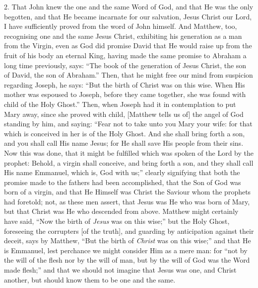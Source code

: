 \documentclass[9pt, twocolumn, oneside, a4paper]{memoir}
\newcommand{\gloss}[1]{%
    \marginpar[\RaggedLeft \footnotesize{#1}]{\RaggedRight \footnotesize{#1}}}
\begin{document}
2. That John knew the one and the same Word of God, and that He was the only begotten, and that He became incarnate for our salvation, Jesus Christ our Lord, I have sufficiently proved from the word of John himself. And Matthew, too, recognising one and the same Jesus Christ, exhibiting his generation as a man from the Virgin,  even as God did promise David that He would raise up from the fruit of his body an eternal King, having made the same promise to Abraham a long time previously, says: ``The book of the generation of Jesus Christ, the son of David, the son of Abraham.'' \gloss{Matthew 1:1} Then, that he might free our mind from suspicion regarding Joseph, he says: ``But the birth of Christ  was on this  wise. When His mother was espoused to Joseph, before they came together, she was found with child of the Holy Ghost.'' Then, when Joseph had it in contemplation to put Mary away, since she proved with child, [Matthew tells us of] the angel of God standing by him, and saying: ``Fear not to take unto you Mary your wife: for that which is conceived in her is of the Holy Ghost. And she shall bring forth a son, and you shall call His name Jesus; for He shall save His people from their sins. Now this was done, that it might be fulfilled which was spoken of the Lord by the prophet: Behold, a virgin shall conceive, and bring forth a son, and they shall call His name Emmanuel, which is, God with us;'' clearly signifying that both the promise made to the fathers had been accomplished, that the Son of God was born of a virgin, and that He Himself was Christ the Saviour whom the prophets had foretold; not, as these men assert, that Jesus was He who was born of Mary, but that Christ was He who descended from above. Matthew might certainly have said, ``Now the birth of \textit{Jesus} was on this wise;'' but the Holy Ghost, foreseeing the corrupters [of the truth], and guarding by anticipation against their deceit, says by Matthew, ``But the birth of \textit{Christ} was on this wise;'' and that He is Emmanuel, lest perchance we might consider Him as a mere man: for ``not by the will of the flesh nor by the will of man, but by the will of God was the Word made flesh;''  and that we should not imagine that Jesus was one, and Christ another, but should know them to be one and the same.
\end{document}

